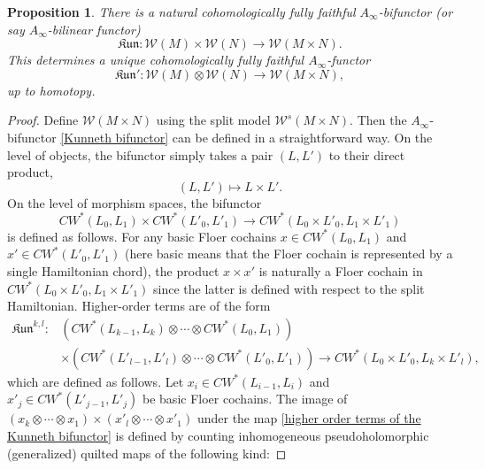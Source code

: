 \documentclass{amsart}
\newtheorem{proposition}[theorem]{Proposition}
\numberwithin{equation}{section}
\numberwithin{figure}{section}
\begin{document}
\begin{proposition} \label{Kunneth formula in general}
	There is a natural cohomologically fully faithful $A_{\infty}$-bifunctor (or say $A_{\infty}$-bilinear functor)
\begin{equation} \label{Kunneth bifunctor}
\mathfrak{Kun}: \mathcal{W}(M) \times \mathcal{W}(N) \to \mathcal{W}(M \times N).
\end{equation}
This determines a unique cohomologically fully faithful $A_{\infty}$-functor
\begin{equation} \label{Kunneth functor}
\mathfrak{Kun}': \mathcal{W}(M) \otimes \mathcal{W}(N) \to \mathcal{W}(M \times N),
\end{equation}
up to homotopy.
\end{proposition}
\begin{proof}
	Define $\mathcal{W}(M \times N)$ using the split model $\mathcal{W}^{s}(M \times N)$. Then the $A_{\infty}$-bifunctor \eqref{Kunneth bifunctor} can be defined in a straightforward way. On the level of objects, the bifunctor simply takes a pair $(L, L')$ to their direct product,
\begin{equation*}
(L, L') \mapsto L \times L'.
\end{equation*}
On the level of morphism spaces, the bifunctor
\begin{equation*}
CW^{*}(L_{0}, L_{1}) \times CW^{*}(L'_{0}, L'_{1}) \to CW^{*}(L_{0} \times L'_{0}, L_{1} \times L'_{1})
\end{equation*}
is defined as follows. For any basic Floer cochains $x \in CW^{*}(L_{0}, L_{1})$ and $x' \in CW^{*}(L'_{0}, L'_{1})$ (here basic means that the Floer cochain is represented by a single Hamiltonian chord), the product $x \times x'$ is naturally a Floer cochain in $CW^{*}(L_{0} \times L'_{0}, L_{1} \times L'_{1})$ since the latter is defined with respect to the split Hamiltonian.
Higher-order terms are of the form
\begin{equation} \label{higher order terms of the Kunneth bifunctor}
\begin{split}
\mathfrak{Kun}^{k, l}: &(CW^{*}(L_{k-1}, L_{k}) \otimes \cdots \otimes CW^{*}(L_{0}, L_{1}))\\
& \times (CW^{*}(L'_{l-1}, L'_{l}) \otimes \cdots \otimes CW^{*}(L'_{0}, L'_{1})) \to CW^{*}(L_{0} \times L'_{0}, L_{k} \times L'_{l}),
\end{split}
\end{equation}
which are defined as follows. Let $x_{i} \in CW^{*}(L_{i-1}, L_{i})$ and $x'_{j} \in CW^{*}(L'_{j-1}, L'_{j})$ be basic Floer cochains. The image of $(x_{k} \otimes \cdots \otimes x_{1}) \times (x'_{l} \otimes \cdots \otimes x'_{1})$ under the map \eqref{higher order terms of the Kunneth bifunctor} is defined by counting inhomogeneous pseudoholomorphic (generalized) quilted maps of the following kind:


\end{proof}
\end{document}
